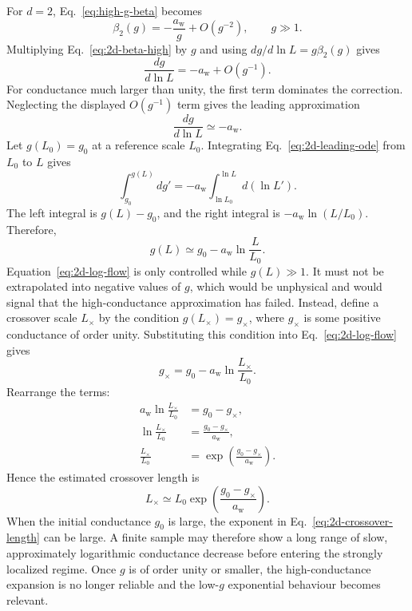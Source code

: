 \documentclass[11pt,a4paper]{article}
\numberwithin{equation}{section}
\begin{document}
For $d=2$, Eq.~\eqref{eq:high-g-beta} becomes
\begin{equation}
    \beta_2(g)=-\frac{a_{\mathrm{w}}}{g}
    +O\!\left(g^{-2}\right),
    \qquad g\gg1.
    \label{eq:2d-beta-high}
\end{equation}
Multiplying Eq.~\eqref{eq:2d-beta-high} by $g$ and using $dg/d\ln L=g\beta_2(g)$ gives
\begin{equation}
    \frac{dg}{d\ln L}=-a_{\mathrm{w}}+O\!\left(g^{-1}\right).
    \label{eq:2d-flow-high}
\end{equation}
For conductance much larger than unity, the first term dominates the correction. Neglecting the displayed $O(g^{-1})$ term gives the leading approximation
\begin{equation}
    \frac{dg}{d\ln L}\simeq-a_{\mathrm{w}}.
    \label{eq:2d-leading-ode}
\end{equation}
Let $g(L_0)=g_0$ at a reference scale $L_0$. Integrating Eq.~\eqref{eq:2d-leading-ode} from $L_0$ to $L$ gives
\begin{equation}
    \int_{g_0}^{g(L)} dg'
    =-a_{\mathrm{w}}\int_{\ln L_0}^{\ln L} d(\ln L').
\end{equation}
The left integral is $g(L)-g_0$, and the right integral is $-a_{\mathrm{w}}\ln(L/L_0)$. Therefore,
\begin{equation}
    g(L)\simeq g_0-a_{\mathrm{w}}\ln\frac{L}{L_0}.
    \label{eq:2d-log-flow}
\end{equation}
Equation~\eqref{eq:2d-log-flow} is only controlled while $g(L)\gg1$. It must not be extrapolated into negative values of $g$, which would be unphysical and would signal that the high-conductance approximation has failed. Instead, define a crossover scale $L_\times$ by the condition $g(L_\times)=g_\times$, where $g_\times$ is some positive conductance of order unity. Substituting this condition into Eq.~\eqref{eq:2d-log-flow} gives
\begin{equation}
    g_\times=g_0-a_{\mathrm{w}}\ln\frac{L_\times}{L_0}.
\end{equation}
Rearrange the terms:
\begin{align}
    a_{\mathrm{w}}\ln\frac{L_\times}{L_0}&=g_0-g_\times,\\
    \ln\frac{L_\times}{L_0}&=\frac{g_0-g_\times}{a_{\mathrm{w}}},\\
    \frac{L_\times}{L_0}&=\exp\left(\frac{g_0-g_\times}{a_{\mathrm{w}}}\right).
\end{align}
Hence the estimated crossover length is
\begin{equation}
    L_\times\simeq L_0\exp\left(\frac{g_0-g_\times}{a_{\mathrm{w}}}\right).
    \label{eq:2d-crossover-length}
\end{equation}
When the initial conductance $g_0$ is large, the exponent in Eq.~\eqref{eq:2d-crossover-length} can be large. A finite sample may therefore show a long range of slow, approximately logarithmic conductance decrease before entering the strongly localized regime. Once $g$ is of order unity or smaller, the high-conductance expansion is no longer reliable and the low-$g$ exponential behaviour becomes relevant.
\end{document}
